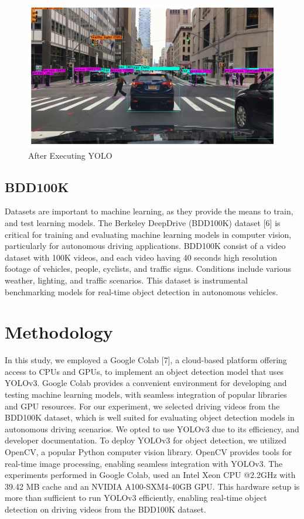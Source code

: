 \documentclass[conference]{IEEEtran}
\begin{document}
\begin{figure}[htbp]
\centerline{\includegraphics[scale=.4]{images/Figure 2.png}}
\caption{After Executing YOLO}
\label{fig2}
\end{figure}

\subsection{BDD100K}
Datasets are important to machine learning, as they provide the means to train, and test learning models. The Berkeley DeepDrive (BDD100K) 
dataset [6] is critical for training and evaluating machine learning models in computer vision, particularly for autonomous driving
applications. BDD100K consist of a video dataset with 100K videos, and each video having 40 seconds high resolution footage of 
vehicles, people, cyclists, and traffic signs. Conditions include various weather, lighting, and traffic scenarios. This dataset 
is instrumental benchmarking models for real-time object detection in autonomous vehicles.

\section{Methodology}
In this study, we employed a Google Colab [7], a cloud-based platform offering access to CPUs and GPUs, to implement an 
object detection model that uses YOLOv3. Google Colab provides a convenient environment for developing and testing machine learning models, with seamless integration 
of popular libraries and GPU resources. For our experiment, we selected driving videos from the BDD100K dataset, which is well 
suited for evaluating object detection models in autonomous driving scenarios. We opted to use YOLOv3 due to its efficiency, and 
developer documentation. To deploy YOLOv3 for object detection, we utilized OpenCV, a popular Python computer vision library. OpenCV
provides tools for real-time image processing, enabling seamless integration with YOLOv3. The experiments performed in Google Colab, 
used an Intel Xeon CPU @2.2GHz with 39.42 MB cache and an NVIDIA A100-SXM4-40GB GPU. This hardware setup is more than sufficient 
to run YOLOv3 efficiently, enabling real-time object detection on driving videos from the BDD100K dataset.
\end{document}
